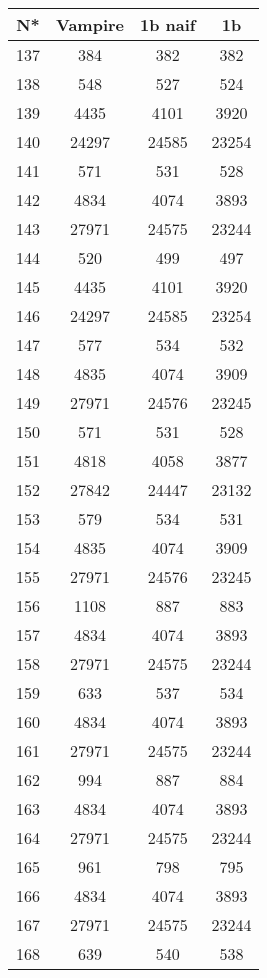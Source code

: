 \begin{table}[H]
\begin{tabular}{|c|c|c|c|}
\hline
N* & Vampire & 1b naif & 1b \\
\hline
137 & 384 & 382 & 382 \\
\hline
138 & 548 & 527 & 524 \\
\hline
139 & 4435 & 4101 & 3920 \\
\hline
140 & 24297 & 24585 & 23254 \\
\hline
141 & 571 & 531 & 528 \\
\hline
142 & 4834 & 4074 & 3893 \\
\hline
143 & 27971 & 24575 & 23244 \\
\hline
144 & 520 & 499 & 497 \\
\hline
145 & 4435 & 4101 & 3920 \\
\hline
146 & 24297 & 24585 & 23254 \\
\hline
147 & 577 & 534 & 532 \\
\hline
148 & 4835 & 4074 & 3909 \\
\hline
149 & 27971 & 24576 & 23245 \\
\hline
150 & 571 & 531 & 528 \\
\hline
151 & 4818 & 4058 & 3877 \\
\hline
152 & 27842 & 24447 & 23132 \\
\hline
153 & 579 & 534 & 531 \\
\hline
154 & 4835 & 4074 & 3909 \\
\hline
155 & 27971 & 24576 & 23245 \\
\hline
156 & 1108 & 887 & 883 \\
\hline
157 & 4834 & 4074 & 3893 \\
\hline
158 & 27971 & 24575 & 23244 \\
\hline
159 & 633 & 537 & 534 \\
\hline
160 & 4834 & 4074 & 3893 \\
\hline
161 & 27971 & 24575 & 23244 \\
\hline
162 & 994 & 887 & 884 \\
\hline
163 & 4834 & 4074 & 3893 \\
\hline
164 & 27971 & 24575 & 23244 \\
\hline
165 & 961 & 798 & 795 \\
\hline
166 & 4834 & 4074 & 3893 \\
\hline
167 & 27971 & 24575 & 23244 \\
\hline
168 & 639 & 540 & 538 \\
\hline

\end{tabular}
\end{table}
